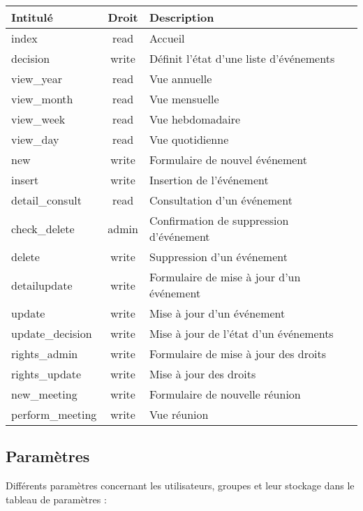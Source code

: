 \begin{tabular}{|l|c|p{9.5cm}|}
 \hline
 \textbf{Intitulé} & \textbf{Droit} & \textbf{Description} \\
 \hline
  index & read & Accueil \\ 
 \hline
  decision & write & Définit l'état d'une liste d'événements \\
 \hline
  view\_year & read & Vue annuelle \\
 \hline
  view\_month & read & Vue mensuelle \\
 \hline
  view\_week & read & Vue hebdomadaire \\
 \hline
  view\_day & read & Vue quotidienne \\
 \hline
  new & write & Formulaire de nouvel événement \\
 \hline
  insert & write & Insertion de l'événement \\
 \hline
  detail\_consult & read & Consultation d'un événement \\
 \hline
  check\_delete & admin & Confirmation de suppression d'événement \\
 \hline
  delete & write & Suppression d'un événement \\
 \hline
  detailupdate & write & Formulaire de mise à jour d'un événement \\
 \hline
  update & write & Mise à jour d'un événement \\
 \hline
  update\_decision & write & Mise à jour de l'état d'un événements \\
 \hline
  rights\_admin & write & Formulaire de mise à jour des droits \\
 \hline
  rights\_update &  write & Mise à jour des droits \\
 \hline
  new\_meeting & write & Formulaire de nouvelle réunion \\
 \hline
  perform\_meeting & write & Vue réunion \\
 \hline
\end{tabular}


\subsection{Paramètres}

Différents paramètres concernant les utilisateurs, groupes et leur stockage dans le tableau de paramètres :\\


